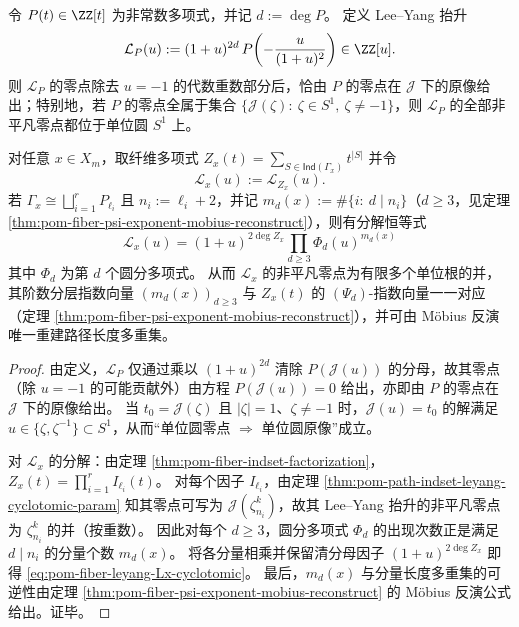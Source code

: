 \begin{proposition}\label{prop:pom-fiber-leyang-unitcircle-lift-cyclotomic}
令 \(P(t)\in\ZZ[t]\) 为非常数多项式，并记 \(d:=\deg P\)。
定义 Lee--Yang 抬升
\[
\mathcal L_P(u):=(1+u)^{2d}\,P\!\left(-\frac{u}{(1+u)^2}\right)\in\ZZ[u].
\]
则 \(\mathcal L_P\) 的零点除去 \(u=-1\) 的代数重数部分后，恰由 \(P\) 的零点在 \(\mathcal J\) 下的原像给出；特别地，若 \(P\) 的零点全属于集合 \(\{\mathcal J(\zeta):\ \zeta\in S^1,\ \zeta\neq -1\}\)，则 \(\mathcal L_P\) 的全部非平凡零点都位于单位圆 \(S^1\) 上。
\par
对任意 \(x\in X_m\)，取纤维多项式 \(Z_x(t)=\sum_{S\in\mathsf{Ind}(\Gamma_x)}t^{|S|}\) 并令
\[
\mathcal L_x(u):=\mathcal L_{Z_x}(u).
\]
若 \(\Gamma_x\cong\bigsqcup_{i=1}^r P_{\ell_i}\) 且 \(n_i:=\ell_i+2\)，并记 \(m_d(x):=\#\{i:\ d\mid n_i\}\)（\(d\ge 3\)，见定理 \ref{thm:pom-fiber-psi-exponent-mobius-reconstruct}），则有分解恒等式
\begin{equation}\label{eq:pom-fiber-leyang-Lx-cyclotomic}
\boxed{\;
\mathcal L_x(u)=(1+u)^{2\deg Z_x}\prod_{d\ge 3}\Phi_d(u)^{m_d(x)}\;}
\end{equation}
其中 \(\Phi_d\) 为第 \(d\) 个圆分多项式。
从而 \(\mathcal L_x\) 的非平凡零点为有限多个单位根的并，其阶数分层指数向量 \((m_d(x))_{d\ge 3}\) 与 \(Z_x(t)\) 的 \((\Psi_d)\)-指数向量一一对应（定理 \ref{thm:pom-fiber-psi-exponent-mobius-reconstruct}），并可由 Möbius 反演唯一重建路径长度多重集。
\end{proposition}

\begin{proof}
由定义，\(\mathcal L_P\) 仅通过乘以 \((1+u)^{2d}\) 清除 \(P(\mathcal J(u))\) 的分母，故其零点（除 \(u=-1\) 的可能贡献外）由方程 \(P(\mathcal J(u))=0\) 给出，亦即由 \(P\) 的零点在 \(\mathcal J\) 下的原像给出。
当 \(t_0=\mathcal J(\zeta)\) 且 \(|\zeta|=1\)、\(\zeta\neq -1\) 时，\(\mathcal J(u)=t_0\) 的解满足 \(u\in\{\zeta,\zeta^{-1}\}\subset S^1\)，从而“单位圆零点 \(\Rightarrow\) 单位圆原像”成立。
\par
对 \(\mathcal L_x\) 的分解：由定理 \ref{thm:pom-fiber-indset-factorization}，
\(
Z_x(t)=\prod_{i=1}^r I_{\ell_i}(t)
\)。
对每个因子 \(I_{\ell_i}\)，由定理 \ref{thm:pom-path-indset-leyang-cyclotomic-param} 知其零点可写为 \(\mathcal J(\zeta_{n_i}^k)\)，故其 Lee--Yang 抬升的非平凡零点为 \(\zeta_{n_i}^k\) 的并（按重数）。
因此对每个 \(d\ge 3\)，圆分多项式 \(\Phi_d\) 的出现次数正是满足 \(d\mid n_i\) 的分量个数 \(m_d(x)\)。
将各分量相乘并保留清分母因子 \((1+u)^{2\deg Z_x}\) 即得 \eqref{eq:pom-fiber-leyang-Lx-cyclotomic}。
最后，\(m_d(x)\) 与分量长度多重集的可逆性由定理 \ref{thm:pom-fiber-psi-exponent-mobius-reconstruct} 的 Möbius 反演公式给出。证毕。
\end{proof}

